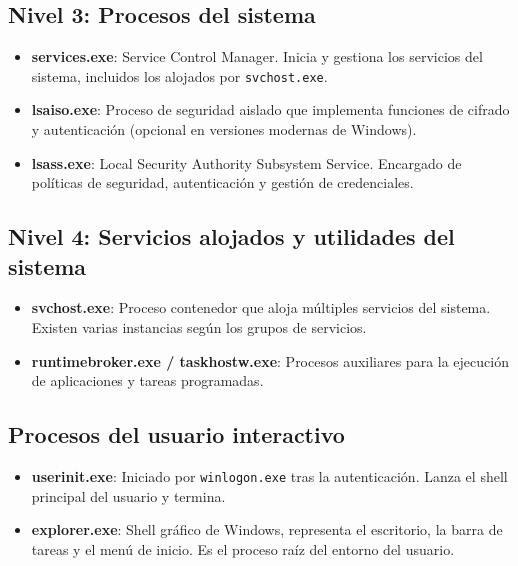 \subsection*{Nivel 3: Procesos del sistema}
\begin{itemize}
    \item \textbf{services.exe}: Service Control Manager. Inicia y gestiona los servicios del sistema, incluidos los alojados por \texttt{svchost.exe}.
    \item \textbf{lsaiso.exe}: Proceso de seguridad aislado que implementa funciones de cifrado y autenticación (opcional en versiones modernas de Windows).
    \item \textbf{lsass.exe}: Local Security Authority Subsystem Service. Encargado de políticas de seguridad, autenticación y gestión de credenciales.
\end{itemize}

\subsection*{Nivel 4: Servicios alojados y utilidades del sistema}
\begin{itemize}
    \item \textbf{svchost.exe}: Proceso contenedor que aloja múltiples servicios del sistema. Existen varias instancias según los grupos de servicios.
    \item \textbf{runtimebroker.exe / taskhostw.exe}: Procesos auxiliares para la ejecución de aplicaciones y tareas programadas.
\end{itemize}

\subsection*{Procesos del usuario interactivo}
\begin{itemize}
    \item \textbf{userinit.exe}: Iniciado por \texttt{winlogon.exe} tras la autenticación. Lanza el shell principal del usuario y termina.
    \item \textbf{explorer.exe}: Shell gráfico de Windows, representa el escritorio, la barra de tareas y el menú de inicio. Es el proceso raíz del entorno del usuario.
\end{itemize}

